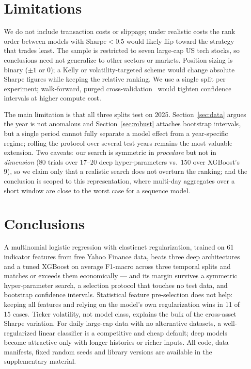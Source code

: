 \documentclass[runningheads]{llncs}
\begin{document}
\section{Limitations}
\label{sec:limitations}

We do not include transaction costs or slippage; under realistic costs the rank order between models with $\text{Sharpe}\!<\!0.5$ would likely flip toward the strategy that trades least. The sample is restricted to seven large-cap US tech stocks, so conclusions need not generalize to other sectors or markets. Position sizing is binary ($\pm 1$ or $0$); a Kelly or volatility-targeted scheme would change absolute Sharpe figures while keeping the relative ranking. We use a single split per experiment; walk-forward, purged cross-validation~\cite{lopezdeprado2018} would tighten confidence intervals at higher compute cost.

The main limitation is that all three splits test on 2025. Section~\ref{sec:data} argues the year is not anomalous and Section~\ref{sec:robust} attaches bootstrap intervals, but a single period cannot fully separate a model effect from a year-specific regime; rolling the protocol over several test years remains the most valuable extension. Two caveats: our search is symmetric in \emph{procedure} but not in \emph{dimension} (80 trials over 17--20 deep hyper-parameters vs.\ 150 over XGBoost's 9), so we claim only that a realistic search does not overturn the ranking; and the conclusion is scoped to this representation, where multi-day aggregates over a short window are close to the worst case for a sequence model.

\section{Conclusions}
\label{sec:conclusions}

A multinomial logistic regression with elasticnet regularization, trained on 61 indicator features from free Yahoo Finance data, beats three deep architectures and a tuned XGBoost on average F1-macro across three temporal splits and matches or exceeds them economically --- and its margin survives a symmetric hyper-parameter search, a selection protocol that touches no test data, and bootstrap confidence intervals. Statistical feature pre-selection does not help: keeping all features and relying on the model's own regularization wins in 11 of 15 cases. Ticker volatility, not model class, explains the bulk of the cross-asset Sharpe variation. For daily large-cap data with no alternative datasets, a well-regularized linear classifier is a competitive and cheap default; deep models become attractive only with longer histories or richer inputs. All code, data manifests, fixed random seeds and library versions are available in the supplementary material.
\end{document}

